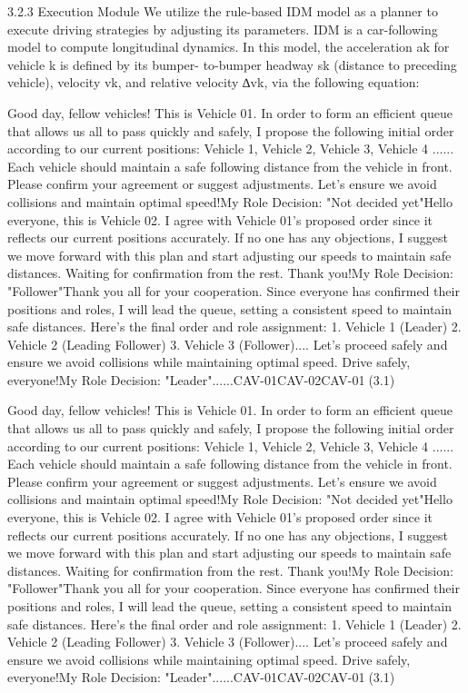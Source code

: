 \documentclass[12pt]{article}
\begin{document}
3.2.3 Execution Module We utilize the rule-based
IDM model as a planner to execute driving strategies by
adjusting its parameters. IDM is a car-following model
to compute longitudinal dynamics. In this model, the
acceleration ak for vehicle k is defined by its bumper-
to-bumper headway sk (distance to preceding vehicle),
velocity vk, and relative velocity ∆vk, via the following
equation:


Good day, fellow vehicles! This is Vehicle 01. In order to form an efficient queue that allows us all to pass quickly and safely, I propose the following initial order according to our current positions: Vehicle 1, Vehicle 2, Vehicle 3, Vehicle 4 ......   Each vehicle should maintain a safe following distance from the vehicle in front. Please confirm your agreement or suggest adjustments. Let's ensure we avoid collisions and maintain optimal speed!My Role Decision: "Not decided yet"Hello everyone, this is Vehicle 02. I agree with Vehicle 01's proposed order since it reflects our current positions accurately. If no one has any objections, I suggest we move forward with this plan and start adjusting our speeds to maintain safe distances. Waiting for confirmation from the rest. Thank you!My Role Decision: "Follower"Thank you all for your cooperation. Since everyone has confirmed their positions and roles, I will lead the queue, setting a consistent speed to maintain safe distances.  Here's the final order and role assignment: 1. Vehicle 1 (Leader) 2. Vehicle 2 (Leading Follower) 3. Vehicle 3 (Follower)....  Let's proceed safely and ensure we avoid collisions while maintaining optimal speed. Drive safely, everyone!My Role Decision: "Leader"......CAV-01CAV-02CAV-01(3.1)


Good day, fellow vehicles! This is Vehicle 01. In order to form an efficient queue that allows us all to pass quickly and safely, I propose the following initial order according to our current positions: Vehicle 1, Vehicle 2, Vehicle 3, Vehicle 4 ......   Each vehicle should maintain a safe following distance from the vehicle in front. Please confirm your agreement or suggest adjustments. Let's ensure we avoid collisions and maintain optimal speed!My Role Decision: "Not decided yet"Hello everyone, this is Vehicle 02. I agree with Vehicle 01's proposed order since it reflects our current positions accurately. If no one has any objections, I suggest we move forward with this plan and start adjusting our speeds to maintain safe distances. Waiting for confirmation from the rest. Thank you!My Role Decision: "Follower"Thank you all for your cooperation. Since everyone has confirmed their positions and roles, I will lead the queue, setting a consistent speed to maintain safe distances.  Here's the final order and role assignment: 1. Vehicle 1 (Leader) 2. Vehicle 2 (Leading Follower) 3. Vehicle 3 (Follower)....  Let's proceed safely and ensure we avoid collisions while maintaining optimal speed. Drive safely, everyone!My Role Decision: "Leader"......CAV-01CAV-02CAV-01(3.1)
\end{document}
